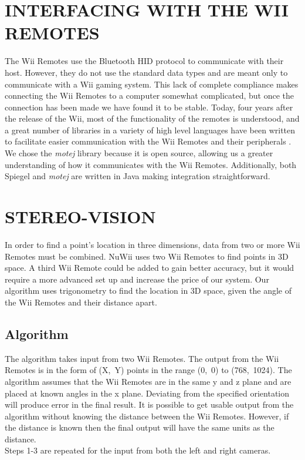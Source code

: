 \documentclass[a4paper,twoside]{article}
\begin{document}
\section{\uppercase{Interfacing With the Wii Remotes}}
\noindent The Wii Remotes use the Bluetooth HID protocol to communicate with their host.
However, they do not use the standard data types and are meant only to communicate with a Wii gaming system. This lack of complete compliance makes connecting the Wii Remotes to a computer somewhat complicated, but once the connection has been made we have found it to be stable. Today, four years after the release of the Wii, most of the functionality of the remotes is understood, and a great
number of libraries in a variety of high level languages have been written to
facilitate easier communication with the Wii Remotes and their peripherals
\cite{WiiBrew10}. We chose the \emph{motej} library because it is open source,
allowing us a greater understanding of how it communicates with the Wii Remotes.
Additionally, both Spiegel and \emph{motej} are written in Java making integration straightforward. 
\section{\uppercase{Stereo-Vision}}
\noindent In order to find a point's location in three dimensions, data from two or more Wii Remotes must be combined. NuWii uses two Wii Remotes to find points in 3D space. A third Wii Remote could be added to gain better accuracy, but it would require a more advanced set up and increase the price of our system. Our algorithm uses trigonometry to find the location in 3D space, given the angle of the Wii Remotes and their distance apart. 
\subsection{Algorithm} 
\noindent The algorithm takes input from two Wii Remotes. The output from the Wii Remotes is in the form of (X,~Y) points in the range (0,~0) to (768,~1024). The algorithm assumes that the Wii Remotes are in the same y and z plane and are placed at known angles in the x plane. Deviating from the specified orientation will produce error in the final result. It is possible to get usable output from the algorithm without knowing the distance between the Wii Remotes. However, if the distance is known then the final output will have the same units as the distance.  \\

\noindent Steps 1-3 are repeated for the input from both the left and right cameras. 
\newenvironment{indenteddescription}%
  {\begin{list}{}{
  \setlength{\labelwidth}{0pt}
  \setlength{\itemindent}{-37pt}
  \setlength{\leftmargin}{37pt}
  \setlength{\listparindent}{\parindent}
  \renewcommand{\makelabel}{\descriptionlabel}}}%
  {\end{list}}
\end{document}
